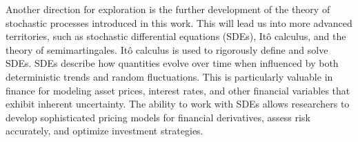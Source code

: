 Another direction for exploration is the further development of the theory of stochastic processes introduced in this work. This will lead us into more advanced territories, such as stochastic differential equations (SDEs), It\^o calculus, and the theory of semimartingales. It\^o calculus is used to rigorously define and solve SDEs. SDEs describe how quantities evolve over time when influenced by both deterministic trends and random fluctuations. This is particularly valuable in finance for modeling asset prices, interest rates, and other financial variables that exhibit inherent uncertainty. The ability to work with SDEs allows researchers to develop sophisticated pricing models for financial derivatives, assess risk accurately, and optimize investment strategies.

